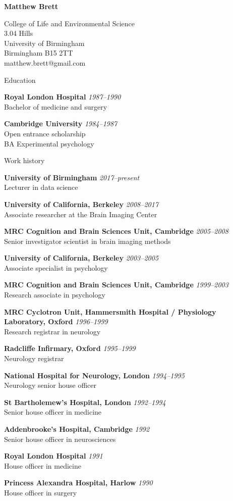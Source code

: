\documentclass{cv}
\newcommand{\PlaceDate}[2]{{\bf #1} \hfill {\em #2} \\}
\newcommand{\PlaceDateNote}[3]{{\bf #1} \hfill {\em #2} \\#3}
\newcommand{\UoB}{University of Birmingham}
\newcommand{\UCB}{University of California, Berkeley}
\newcommand{\CBU}{MRC Cognition and Brain Sciences Unit, Cambridge}
\begin{document}
\nocite{*}

{\huge \bf Matthew Brett}

College of Life and Environmental Science \\
3.04 Hills \\
University of Birmingham \\
Birmingham B15 2TT \\
matthew.brett@gmail.com

\begin{cvSection}{Education}

\PlaceDate{Royal London Hospital}{1987--1990 }
Bachelor of medicine and surgery

\PlaceDateNote{Cambridge University}{1984--1987 }{
Open entrance scholarship \\
BA Experimental psychology}

\end{cvSection}

\begin{cvSection}{Work history}

\PlaceDateNote{\UoB}{2017--present }{
    Lecturer in data science}

\PlaceDateNote{\UCB}{2008--2017 }{
    Associate researcher at the Brain Imaging Center}

\PlaceDateNote{\CBU}{2005--2008}{
    Senior investigator scientist in brain imaging methods}

\PlaceDateNote{\UCB}{2003--2005 }{
    Associate specialist in psychology}

\PlaceDateNote{\CBU}{1999--2003 }{
    Research associate in psychology}

\PlaceDateNote{
MRC Cyclotron Unit, Hammersmith Hospital / Physiology Laboratory, Oxford}
{1996--1999}
{Research registrar in neurology}

\PlaceDateNote{Radcliffe Infirmary, Oxford}
{1995--1999}
{Neurology registrar}

\PlaceDateNote{National Hospital for Neurology, London}{1994--1995 }{
Neurology senior house officer}

\PlaceDateNote{St Bartholemew's Hospital, London}{1992--1994 }{
Senior house officer in medicine}

\PlaceDateNote{Addenbrooke's Hospital, Cambridge}{1992 }{
Senior house officer in neurosciences}

\PlaceDateNote{Royal London Hospital}{1991 }{
House officer in medicine}

\PlaceDateNote{Princess Alexandra Hospital, Harlow}{1990 }{
House officer in surgery}

\end{cvSection}
\end{document}
